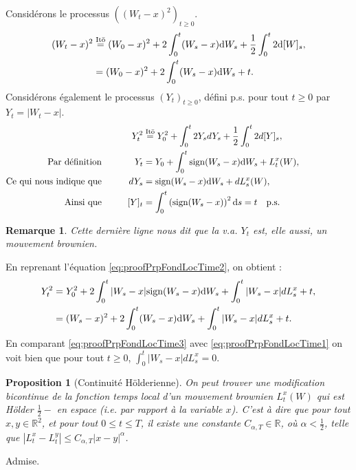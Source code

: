 \documentclass[openany]{book}
\makeatletter
\newcommand{\R}{\mathbb{R}}
\newcommand{\1}{\mathbbm{1}}
\newcommand{\sign}{\text{sign}}
\renewcommand{\d}{\mathrm{d}}
\renewenvironment{proof}[1][\textbf{\textit{Démonstration}}]{%
  \par\pushQED{\qed}%
  \normalfont\topsep6\p@\@plus6\p@\relax
  \trivlist\item[\hskip\labelsep
    #1\@addpunct{.}]\ignorespaces
}{%
  \popQED\endtrivlist\@endpefalse
}
\theoremstyle{thmfont}
\theoremstyle{deffont}
\theoremstyle{thmfont}
\newtheorem{prop}[prop]{Proposition}
\theoremstyle{deffont}
\newtheorem{remark}[remark]{Remarque}
\makeatother
\begin{document}
\begin{proof}
    Considérons le processus $\left((W_t - x)^2\right)_{t\geq0}$.
    \begin{align}
      (W_t -x)^2 &\overset{\text{Itō}}{=} (W_0-x)^2 + 2\int_0^t (W_s -x)\d W_s + \dfrac{1}{2} \int_0^t 2 \d [W]_s,\notag\\
                 &= (W_0-x)^2 + 2\int_0^t (W_s -x)\d W_s + t. \label{eq:proofPrpFondLocTime1}
    \end{align}
    \noindent Considérons également le processus $(Y_t)_{t\geq0}$, défini p.s. pour tout $t\geq0$ par $Y_t = |W_t-x|$.
    \begin{alignat}{2}
     && Y_t^2 &\overset{\text{Itō}}{=} Y_0^2 + \int_0^t 2Y_s dY_s + \dfrac{1}{2} \int_0^t 2 d[Y]_s, \label{eq:proofPrpFondLocTime2} \\
     \text{Par définition}&&\qquad Y_t &= Y_0 + \int_0^t \sign(W_s -x) \d W_s + L_t^x(W),\quad\qquad\notag\\
      \text{Ce qui nous indique que}&&\qquad dY_s &=  \sign(W_s -x) \d W_s + dL_s^x(W),\qquad\qquad\qquad\qquad\quad\notag\\
     \text{Ainsi que}&& [Y]_t &= \int_0^t \left(\sign(W_s-x)\right)^2 \d s = t \quad\text{p.s.}\notag\\
    \end{alignat}
    \begin{remark}Cette dernière ligne nous dit que la v.a. $Y_t$ est, elle aussi, un mouvement brownien.
    \end{remark}
    

    \noindent En reprenant l’équation \eqref{eq:proofPrpFondLocTime2}, on obtient :
    \begin{align}
      Y_t^2 &= Y_0^2 + 2\int_0^t |W_s - x| \sign(W_s-x) \d W_s + \int_0^t |W_s-x| dL_s^x + t,\notag\\
      &= (W_s -x)^2 + 2\int_0^t (W_s -x) \d W_s + \int_0^t |W_s -x| dL_s^x + t. \label{eq:proofPrpFondLocTime3}
    \end{align}
    En comparant \eqref{eq:proofPrpFondLocTime3} avec \eqref{eq:proofPrpFondLocTime1} on voit bien que pour tout $t\geq0$, $\int_0^t |W_s-x|dL_s^x = 0$.
\end{proof}


  \begin{prop}[Continuité Hölderienne]
    On peut trouver une modification bicontinue de la fonction temps local d'un mouvement brownien $L_t^x(W)$ qui est Hölder $\frac{1}{2}-$ en espace (i.e. par rapport à la variable $x$). C'est à dire que pour tout $x, y \in\R^2$, et pour tout $0\leq t \leq T$, il existe une constante $C_{\alpha,T} \in \R$, où $\alpha < \frac{1}{2}$, telle que $|L_t^x - L_t^y|\leq C_{\alpha,T}|x - y|^\alpha$.
  \end{prop}
  \begin{proof}
    Admise.
\end{proof}
\end{document}
